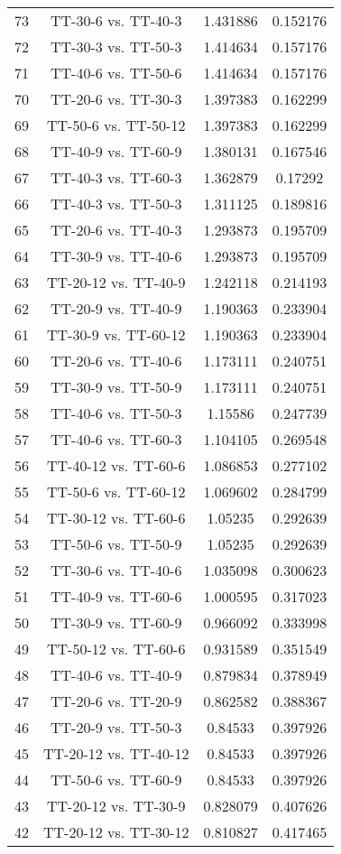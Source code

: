 \documentclass[a4paper,10pt]{article}
\begin{document}
\begin{landscape}
\begin{table}[!htp]
\begin{tabular}{cccc}
73&TT-30-6 vs. TT-40-3&1.431886&0.152176\\
72&TT-30-3 vs. TT-50-3&1.414634&0.157176\\
71&TT-40-6 vs. TT-50-6&1.414634&0.157176\\
70&TT-20-6 vs. TT-30-3&1.397383&0.162299\\
69&TT-50-6 vs. TT-50-12&1.397383&0.162299\\
68&TT-40-9 vs. TT-60-9&1.380131&0.167546\\
67&TT-40-3 vs. TT-60-3&1.362879&0.17292\\
66&TT-40-3 vs. TT-50-3&1.311125&0.189816\\
65&TT-20-6 vs. TT-40-3&1.293873&0.195709\\
64&TT-30-9 vs. TT-40-6&1.293873&0.195709\\
63&TT-20-12 vs. TT-40-9&1.242118&0.214193\\
62&TT-20-9 vs. TT-40-9&1.190363&0.233904\\
61&TT-30-9 vs. TT-60-12&1.190363&0.233904\\
60&TT-20-6 vs. TT-40-6&1.173111&0.240751\\
59&TT-30-9 vs. TT-50-9&1.173111&0.240751\\
58&TT-40-6 vs. TT-50-3&1.15586&0.247739\\
57&TT-40-6 vs. TT-60-3&1.104105&0.269548\\
56&TT-40-12 vs. TT-60-6&1.086853&0.277102\\
55&TT-50-6 vs. TT-60-12&1.069602&0.284799\\
54&TT-30-12 vs. TT-60-6&1.05235&0.292639\\
53&TT-50-6 vs. TT-50-9&1.05235&0.292639\\
52&TT-30-6 vs. TT-40-6&1.035098&0.300623\\
51&TT-40-9 vs. TT-60-6&1.000595&0.317023\\
50&TT-30-9 vs. TT-60-9&0.966092&0.333998\\
49&TT-50-12 vs. TT-60-6&0.931589&0.351549\\
48&TT-40-6 vs. TT-40-9&0.879834&0.378949\\
47&TT-20-6 vs. TT-20-9&0.862582&0.388367\\
46&TT-20-9 vs. TT-50-3&0.84533&0.397926\\
45&TT-20-12 vs. TT-40-12&0.84533&0.397926\\
44&TT-50-6 vs. TT-60-9&0.84533&0.397926\\
43&TT-20-12 vs. TT-30-9&0.828079&0.407626\\
42&TT-20-12 vs. TT-30-12&0.810827&0.417465\\

\end{tabular}
\end{table}
\end{landscape}
\end{document}
